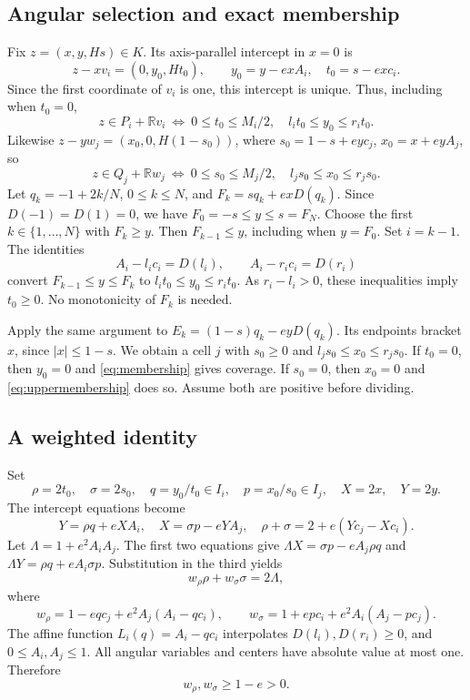\documentclass[11pt]{article}
\newcommand{\R}{\mathbb R}
\begin{document}
\subsection{Angular selection and exact membership}
Fix \(z=(x,y,Hs)\in K\). Its axis-parallel intercept in \(x=0\) is
\[
 z-xv_i=(0,y_0,Ht_0),\qquad y_0=y-exA_i,\quad t_0=s-exc_i.
\]
Since the first coordinate of \(v_i\) is one, this intercept is unique.
Thus, including when \(t_0=0\),
\begin{equation}\label{eq:membership}
 z\in P_i+\R v_i\ \Longleftrightarrow\
 0\le t_0\le M_i/2,\quad l_it_0\le y_0\le r_it_0.
\end{equation}
Likewise \(z-yw_j=(x_0,0,H(1-s_0))\), where
\(s_0=1-s+eyc_j\), \(x_0=x+eyA_j\), so
\begin{equation}\label{eq:uppermembership}
 z\in Q_j+\R w_j\ \Longleftrightarrow\
 0\le s_0\le M_j/2,\quad l_js_0\le x_0\le r_js_0.
\end{equation}
Let \(q_k=-1+2k/N\), \(0\le k\le N\), and
\(F_k=sq_k+exD(q_k)\).
Since \(D(-1)=D(1)=0\), we have \(F_0=-s\le y\le s=F_N\).
Choose the first \(k\in\{1,\ldots,N\}\) with \(F_k\ge y\).
Then \(F_{k-1}\le y\), including when \(y=F_0\).
Set \(i=k-1\). The identities
\[
 A_i-l_ic_i=D(l_i),\qquad A_i-r_ic_i=D(r_i)
\]
convert \(F_{k-1}\le y\le F_k\) to \(l_it_0\le y_0\le r_it_0\).
As \(r_i-l_i>0\), these inequalities imply \(t_0\ge0\).
No monotonicity of \(F_k\) is needed.

Apply the same argument to \(E_k=(1-s)q_k-eyD(q_k)\).
Its endpoints bracket \(x\), since \(|x|\le1-s\). We obtain a cell
\(j\) with \(s_0\ge0\) and \(l_js_0\le x_0\le r_js_0\).
If \(t_0=0\), then \(y_0=0\) and \eqref{eq:membership} gives coverage.
If \(s_0=0\), then \(x_0=0\) and \eqref{eq:uppermembership} does so.
Assume both are positive before dividing.

\subsection{A weighted identity}
Set
\[
 \rho=2t_0,\quad \sigma=2s_0,\quad q=y_0/t_0\in I_i,\quad
 p=x_0/s_0\in I_j,\quad X=2x,\quad Y=2y.
\]
The intercept equations become
\begin{equation}\label{eq:intercepts}
 Y=\rho q+eXA_i,\quad X=\sigma p-eYA_j,\quad
 \rho+\sigma=2+e(Yc_j-Xc_i).
\end{equation}
Let \(\Lambda=1+e^2A_iA_j\).
The first two equations give
\(\Lambda X=\sigma p-eA_j\rho q\) and
\(\Lambda Y=\rho q+eA_i\sigma p\).
Substitution in the third yields
\begin{equation}\label{eq:weighted}
 w_\rho\rho+w_\sigma\sigma=2\Lambda,
\end{equation}
where
\[
 w_\rho=1-eqc_j+e^2A_j(A_i-qc_i),\qquad
 w_\sigma=1+epc_i+e^2A_i(A_j-pc_j).
\]
The affine function \(L_i(q)=A_i-qc_i\) interpolates
\(D(l_i),D(r_i)\ge0\), and \(0\le A_i,A_j\le1\).
All angular variables and centers have absolute value at most one.
Therefore
\begin{equation}\label{eq:positive}
 w_\rho,w_\sigma\ge1-e>0.
\end{equation}
\end{document}
